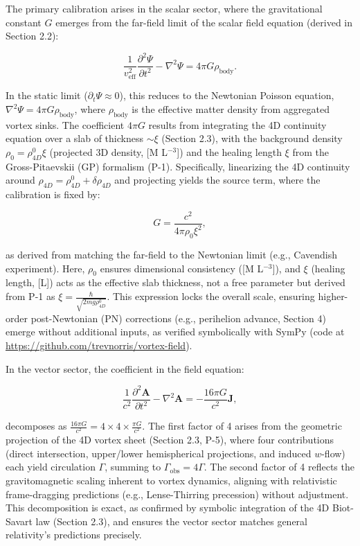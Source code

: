 The primary calibration arises in the scalar sector, where the gravitational constant $G$ emerges from the far-field limit of the scalar field equation (derived in Section 2.2):

\[
\frac{1}{v_{\text{eff}}^2} \frac{\partial^2 \Psi}{\partial t^2} - \nabla^2 \Psi = 4\pi G \rho_{\text{body}}.
\]

In the static limit ($\partial_t \Psi \approx 0$), this reduces to the Newtonian Poisson equation, $\nabla^2 \Psi = 4\pi G \rho_{\text{body}}$, where $\rho_{\text{body}}$ is the effective matter density from aggregated vortex sinks. The coefficient $4\pi G$ results from integrating the 4D continuity equation over a slab of thickness $\sim \xi$ (Section 2.3), with the background density $\rho_0 = \rho_{4D}^0 \xi$ (projected 3D density, [M L$^{-3}$]) and the healing length $\xi$ from the Gross-Pitaevskii (GP) formalism (P-1). Specifically, linearizing the 4D continuity around $\rho_{4D} = \rho_{4D}^0 + \delta \rho_{4D}$ and projecting yields the source term, where the calibration is fixed by:

\[
G = \frac{c^2}{4\pi \rho_0 \xi^2},
\]

as derived from matching the far-field to the Newtonian limit (e.g., Cavendish experiment). Here, $\rho_0$ ensures dimensional consistency ([M L$^{-3}$]), and $\xi$ (healing length, [L]) acts as the effective slab thickness, not a free parameter but derived from P-1 as $\xi = \frac{\hbar}{\sqrt{2 m g \rho_{4D}^0}}$. This expression locks the overall scale, ensuring higher-order post-Newtonian (PN) corrections (e.g., perihelion advance, Section 4) emerge without additional inputs, as verified symbolically with SymPy (code at \url{https://github.com/trevnorris/vortex-field}).

In the vector sector, the coefficient in the field equation:

\[
\frac{1}{c^2} \frac{\partial^2 \mathbf{A}}{\partial t^2} - \nabla^2 \mathbf{A} = -\frac{16\pi G}{c^2} \mathbf{J},
\]

decomposes as $\frac{16\pi G}{c^2} = 4 \times 4 \times \frac{\pi G}{c^2}$. The first factor of 4 arises from the geometric projection of the 4D vortex sheet (Section 2.3, P-5), where four contributions (direct intersection, upper/lower hemispherical projections, and induced $w$-flow) each yield circulation $\Gamma$, summing to $\Gamma_{\text{obs}} = 4\Gamma$. The second factor of 4 reflects the gravitomagnetic scaling inherent to vortex dynamics, aligning with relativistic frame-dragging predictions (e.g., Lense-Thirring precession) without adjustment. This decomposition is exact, as confirmed by symbolic integration of the 4D Biot-Savart law (Section 2.3), and ensures the vector sector matches general relativity’s predictions precisely.

